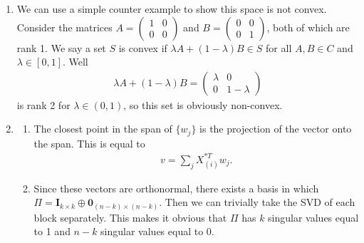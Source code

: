 \documentclass{article}
\begin{document}
\begin{enumerate}
    \item We can use a simple counter example to show this space is not convex.
    Consider the matrices $A = \begin{pmatrix} 1 & 0 \\ 0 & 0 \end{pmatrix}$ and $B = \begin{pmatrix} 0 & 0 \\ 0 & 1 \end{pmatrix}$, both of which are rank 1.
    We say a set $S$ is convex if $\lambda A + (1-\lambda) B \in S$ for all $A,B \in C$ and $\lambda \in [0,1]$.
    Well 
    \begin{align*}
        \lambda A + (1-\lambda) B = 
        \begin{pmatrix}
            \lambda & 0 \\ 0 & 1-\lambda
        \end{pmatrix}
    \end{align*}
    is rank 2 for $\lambda \in (0,1)$, so this set is obviously non-convex.

    \item 
    \begin{enumerate}
        \item The closest point in the span of $\{w_j\}$ is the projection of the vector onto the span.
        This is equal to
        \begin{align*}
            v = \sum_j X_{(i)}^{*T} w_j.
        \end{align*}

        \item Since these vectors are orthonormal, there exists a basis in which $\Pi = \mathbf{I}_{k \times k} \oplus \mathbf{0}_{(n-k) \times (n-k)}$.
        Then we can trivially take the SVD of each block separately.
        This makes it obvious that $\Pi$ has $k$ singular values equal to 1 and $n-k$ singular values equal to 0.


\end{enumerate}
\end{enumerate}
\end{document}
